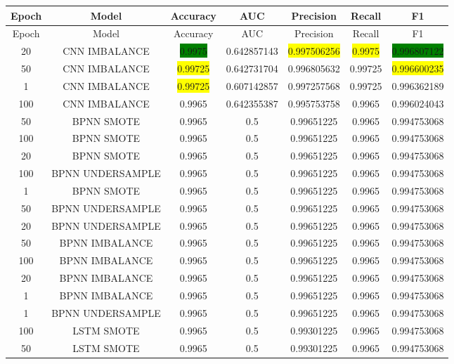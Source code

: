     \begin{longtable}{|c|c|c|c|c|c|c|}
  	\hline
  	Epoch & Model & Accuracy & AUC & Precision & Recall & F1\\ \hline
  	\endfirsthead
  	\hline
  	Epoch & Model & Accuracy & AUC & Precision & Recall & F1\\ \hline
  	\endhead
  	20 & CNN IMBALANCE & \colorbox{green}{0.9975} & 0.642857143 & \colorbox{yellow}{0.997506256} & \colorbox{yellow}{0.9975} & \colorbox{green}{0.996807122}\\ \hline
  	50 & CNN IMBALANCE & \colorbox{yellow}{0.99725} & 0.642731704 & 0.996805632 & 0.99725 & \colorbox{yellow}{0.996600235}\\ \hline
  	1 & CNN IMBALANCE & \colorbox{yellow}{0.99725}  & 0.607142857 & 0.997257568 & 0.99725 & 0.996362189\\ \hline
  	100 & CNN IMBALANCE & 0.9965 & 0.642355387 & 0.995753758 & 0.9965 & 0.996024043\\ \hline
  	50 & BPNN SMOTE & 0.9965 & 0.5 & 0.99651225 & 0.9965 & 0.994753068\\ \hline
  	100 & BPNN SMOTE & 0.9965 & 0.5 & 0.99651225 & 0.9965 & 0.994753068\\ \hline
  	20 & BPNN SMOTE & 0.9965 & 0.5 & 0.99651225 & 0.9965 & 0.994753068\\ \hline
  	100 & BPNN UNDERSAMPLE & 0.9965 & 0.5 & 0.99651225 & 0.9965 & 0.994753068\\ \hline
  	1 & BPNN SMOTE & 0.9965 & 0.5 & 0.99651225 & 0.9965 & 0.994753068\\ \hline
  	50 & BPNN UNDERSAMPLE & 0.9965 & 0.5 & 0.99651225 & 0.9965 & 0.994753068\\ \hline
  	20 & BPNN UNDERSAMPLE & 0.9965 & 0.5 & 0.99651225 & 0.9965 & 0.994753068\\ \hline
  	50 & BPNN IMBALANCE & 0.9965 & 0.5 & 0.99651225 & 0.9965 & 0.994753068\\ \hline
  	100 & BPNN IMBALANCE & 0.9965 & 0.5 & 0.99651225 & 0.9965 & 0.994753068\\ \hline
  	20 & BPNN IMBALANCE & 0.9965 & 0.5 & 0.99651225 & 0.9965 & 0.994753068\\ \hline
  	1 & BPNN IMBALANCE & 0.9965 & 0.5 & 0.99651225 & 0.9965 & 0.994753068\\ \hline
  	1 & BPNN UNDERSAMPLE & 0.9965 & 0.5 & 0.99651225 & 0.9965 & 0.994753068\\ \hline
  	100 & LSTM SMOTE & 0.9965 & 0.5 & 0.99301225 & 0.9965 & 0.994753068\\ \hline
  	50 & LSTM SMOTE & 0.9965 & 0.5 & 0.99301225 & 0.9965 & 0.994753068\\ \hline

\end{longtable}
